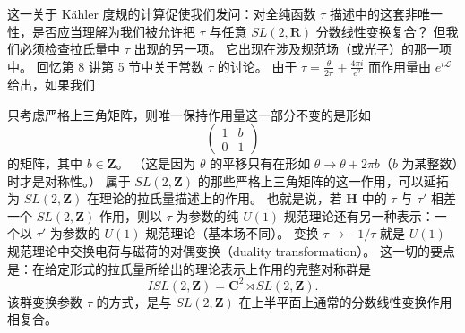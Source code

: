 
这一关于 Kähler 度规的计算促使我们发问：对全纯函数 $\tau$ 描述中的这套非唯一性，是否应当理解为我们被允许把 $\tau$ 与任意 $SL(2,\mathbf{R})$ 分数线性变换复合？
但我们必须检查拉氏量中 $\tau$ 出现的另一项。
它出现在涉及规范场（或光子）的那一项中。
回忆第 8 讲第 5 节中关于常数 $\tau$ 的讨论。
由于 $\tau=\frac{\theta}{2\pi}+\frac{4\pi i}{e^2}$ 而作用量由 $e^{i\mathcal{L}}$ 给出，如果我们


只考虑严格上三角矩阵，则唯一保持作用量这一部分不变的是形如
\[
\begin{pmatrix}1&b\\0&1\end{pmatrix}
\]
的矩阵，其中 $b\in\mathbf{Z}$。
（这是因为 $\theta$ 的平移只有在形如 $\theta\to\theta+2\pi b$（$b$ 为某整数）时才是对称性。）
属于 $SL(2,\mathbf{Z})$ 的那些严格上三角矩阵的这一作用，可以延拓为 $SL(2,\mathbf{Z})$ 在理论的拉氏量描述上的作用。
也就是说，若 $\mathbf{H}$ 中的 $\tau$ 与 $\tau'$ 相差一个 $SL(2,\mathbf{Z})$ 作用，则以 $\tau$ 为参数的纯 $U(1)$ 规范理论还有另一种表示：一个以 $\tau'$ 为参数的 $U(1)$ 规范理论（基本场不同）。
变换 $\tau\to-1/\tau$ 就是 $U(1)$ 规范理论中交换电荷与磁荷的对偶变换（duality transformation）。
这一切的要点是：在给定形式的拉氏量所给出的理论表示上作用的完整对称群是
\[
ISL(2,\mathbf{Z})=\mathbf{C}^2\rtimes SL(2,\mathbf{Z}).
\]
该群变换参数 $\tau$ 的方式，是与 $SL(2,\mathbf{Z})$ 在上半平面上通常的分数线性变换作用相复合。


